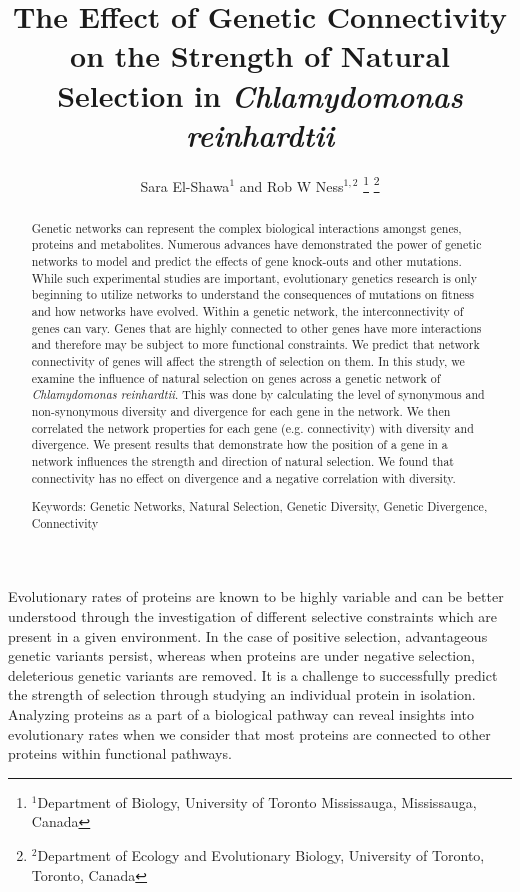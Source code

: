 \documentclass[letterpaper, 10 pt, conference]{ieeeconf}  %
\title{\LARGE \bf
The Effect of Genetic Connectivity on the Strength of Natural Selection in \textit{Chlamydomonas reinhardtii }
}
\author{Sara El-Shawa$^{1}$ and Rob W Ness$^{1, 2}$%
\thanks{$^{1}$Department of Biology, University of Toronto Mississauga, Mississauga, Canada
        {\tt\small}}%
\thanks{$^{2}$Department of Ecology and Evolutionary Biology, University of Toronto, Toronto, Canada
        {\tt\small }}%
}
\begin{document}
\maketitle
\thispagestyle{empty}
\pagestyle{empty}


\begin{abstract}

Genetic networks can represent the complex biological interactions amongst genes, proteins and metabolites. Numerous advances have demonstrated the power of genetic networks to model and predict the effects of gene knock-outs and other mutations. While such experimental studies are important, evolutionary genetics research is only beginning to utilize networks to understand the consequences of mutations on fitness and how networks have evolved. Within a genetic network, the interconnectivity of genes can vary. Genes that are highly connected to other genes have more interactions and therefore may be subject to more functional constraints. We predict that network connectivity of genes will affect the strength of selection on them. In this study, we examine the influence of natural selection on genes across a genetic network of \textit{Chlamydomonas reinhardtii}. This was done by calculating the level of synonymous and non-synonymous diversity and divergence for each gene in the network. We then correlated the network properties for each gene (e.g. connectivity) with diversity and divergence. We present results that demonstrate how the position of a gene in a network influences the strength and direction of natural selection. We found that connectivity has no effect on divergence and a negative correlation with diversity. 

Keywords: Genetic Networks, Natural Selection, Genetic Diversity, Genetic Divergence, Connectivity
\end{abstract}

\section*{}

\setlength{\parindent}{10ex} Evolutionary rates of proteins are known to be highly variable and can be better understood through the investigation of different selective constraints which are present in a given environment. In the case of positive selection, advantageous genetic variants persist, whereas when proteins are under negative selection, deleterious genetic variants are removed. It is a challenge to successfully predict the strength of selection through studying an individual protein in isolation. Analyzing proteins as a part of a biological pathway can reveal insights into evolutionary rates when we consider that most proteins are connected to other proteins within functional pathways. 
\end{document}
